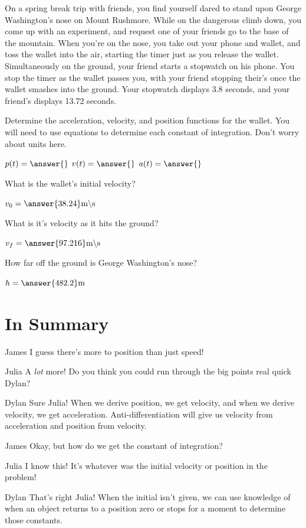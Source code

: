 \documentclass{ximera}
\begin{document}
\begin{question}
On a spring break trip with friends, you find yourself dared to stand upon George Washington's nose on Mount Rushmore. While on the dangerous climb down, you come up with an experiment, and request one of your friends go to the base of the mountain. When you're on the nose, you take out your phone and wallet, and toss the wallet into the air, starting the timer just as you release the wallet. Simultaneously on the ground, your friend starts a stopwatch on his phone. You stop the timer as the wallet passes you, with your friend stopping their's once the wallet smashes into the ground. Your stopwatch displays 3.8 seconds, and your friend's displays 13.72 seconds.

Determine the acceleration, velocity, and position functions for the wallet. You will need to use equations to determine each constant of integration. Don't worry about units here.

$p(t) = \answer{}$
$v(t) = \answer{}$
$a(t) = \answer{}$

What is the wallet's initial velocity?

$v_0 = \answer{38.24} \text{m} \backslash \text{s}$

What is it's velocity as it hits the ground?

$v_f = \answer{97.216} \text{m} \backslash \text{s}$

How far off the ground is George Washington's nose?

$h = \answer{482.2} \text{m}$
\end{question}

\section{In Summary}
\begin{dialogue}
\item[James] I guess there's more to position than just speed!
\item[Julia] A \textit{lot} more! Do you think you could run through the big points real quick Dylan?
\item[Dylan] Sure Julia! When we derive position, we get velocity, and when we derive velocity, we get acceleration. Anti-differentiation will give us velocity from acceleration and position from velocity.
\item[James] Okay, but how do we get the constant of integration?
\item[Julia] I know this! It's whatever was the initial velocity or position in the problem!
\item[Dylan] That's right Julia! When the initial isn't given, we can use knowledge of when an object returns to a position zero or stops for a moment to determine those constants.
\end{dialogue}
\end{document}
